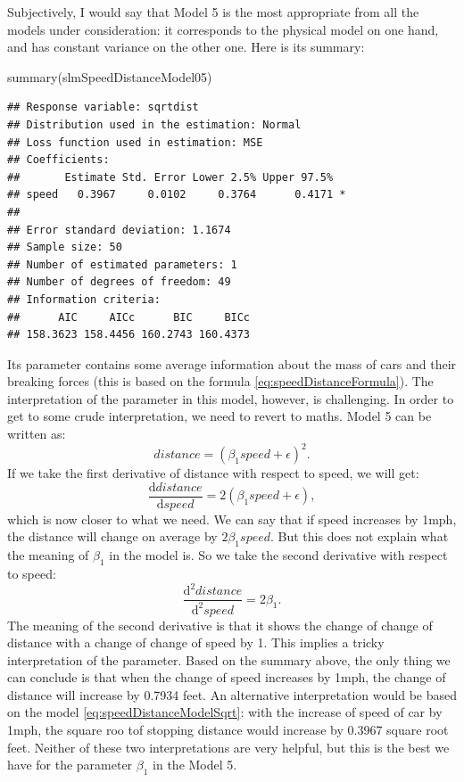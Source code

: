 \documentclass[
]{book}
\newenvironment{Shaded}{\begin{snugshade}}{\end{snugshade}}
\newcommand{\FunctionTok}[1]{\textcolor[rgb]{0.00,0.00,0.00}{#1}}
\newcommand{\NormalTok}[1]{#1}
\theoremstyle{definition}
\theoremstyle{definition}
\theoremstyle{definition}
\theoremstyle{definition}
\theoremstyle{remark}
\begin{document}
Subjectively, I would say that Model 5 is the most appropriate from all the models under consideration: it corresponds to the physical model on one hand, and has constant variance on the other one. Here is its summary:

\begin{Shaded}
\begin{Highlighting}[]
\FunctionTok{summary}\NormalTok{(slmSpeedDistanceModel05)}
\end{Highlighting}
\end{Shaded}

\begin{verbatim}
## Response variable: sqrtdist
## Distribution used in the estimation: Normal
## Loss function used in estimation: MSE
## Coefficients:
##       Estimate Std. Error Lower 2.5% Upper 97.5%  
## speed   0.3967     0.0102     0.3764      0.4171 *
## 
## Error standard deviation: 1.1674
## Sample size: 50
## Number of estimated parameters: 1
## Number of degrees of freedom: 49
## Information criteria:
##      AIC     AICc      BIC     BICc 
## 158.3623 158.4456 160.2743 160.4373
\end{verbatim}

Its parameter contains some average information about the mass of cars and their breaking forces (this is based on the formula \eqref{eq:speedDistanceFormula}). The interpretation of the parameter in this model, however, is challenging. In order to get to some crude interpretation, we need to revert to maths. Model 5 can be written as:
\begin{equation}
    distance = (\beta_1 speed + \epsilon)^2 .
    \label{eq:speedDistanceModelSqrt3}
\end{equation}
If we take the first derivative of distance with respect to speed, we will get:
\begin{equation}
    \frac{\mathrm{d}distance}{\mathrm{d}speed} = 2 (\beta_1 speed + \epsilon) ,
    \label{eq:speedDistanceModelSqrt4}
\end{equation}
which is now closer to what we need. We can say that if speed increases by 1mph, the distance will change on average by \(2 \beta_1 speed\). But this does not explain what the meaning of \(\beta_1\) in the model is. So we take the second derivative with respect to speed:
\begin{equation}
    \frac{\mathrm{d}^2 distance}{\mathrm{d}^2 speed} = 2 \beta_1 .
    \label{eq:speedDistanceModelSqrt5}
\end{equation}
The meaning of the second derivative is that it shows the change of change of distance with a change of change of speed by 1. This implies a tricky interpretation of the parameter. Based on the summary above, the only thing we can conclude is that when the change of speed increases by 1mph, the change of distance will increase by 0.7934 feet. An alternative interpretation would be based on the model \eqref{eq:speedDistanceModelSqrt}: with the increase of speed of car by 1mph, the square roo tof stopping distance would increase by 0.3967 square root feet. Neither of these two interpretations are very helpful, but this is the best we have for the parameter \(\beta_1\) in the Model 5.
\end{document}
